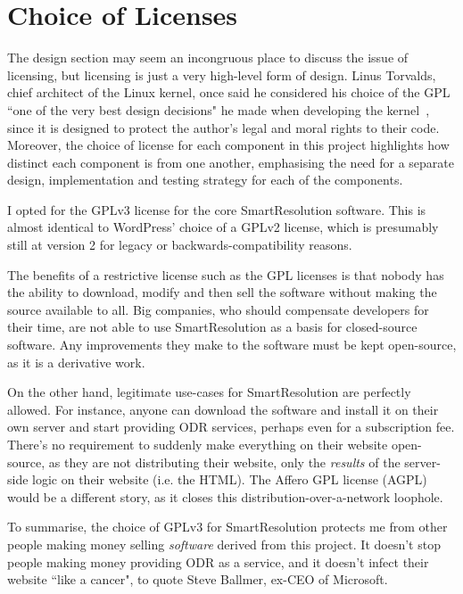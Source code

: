 \section{Choice of Licenses}

The design section may seem an incongruous place to discuss the issue of licensing, but licensing is just a very high-level form of design. Linus Torvalds, chief architect of the Linux kernel, once said he considered his choice of the GPL ``one of the very best design decisions" he made when developing the kernel~\cite{linusLinux}, since it is designed to protect the author's legal and moral rights to their code. Moreover, the choice of license for each component in this project highlights how distinct each component is from one another, emphasising the need for a separate design, implementation and testing strategy for each of the components.

I opted for the GPLv3 license for the core SmartResolution software. This is almost identical to WordPress' choice of a GPLv2 license, which is presumably still at version 2 for legacy or backwards-compatibility reasons.

The benefits of a restrictive license such as the GPL licenses is that nobody has the ability to download, modify and then sell the software without making the source available to all. Big companies, who should compensate developers for their time, are not able to use SmartResolution as a basis for closed-source software. Any improvements they make to the software must be kept open-source, as it is a derivative work.

On the other hand, legitimate use-cases for SmartResolution are perfectly allowed. For instance, anyone can download the software and install it on their own server and start providing ODR services, perhaps even for a subscription fee. There's no requirement to suddenly make everything on their website open-source, as they are not distributing their website, only the \emph{results} of the server-side logic on their website (i.e. the HTML). The Affero GPL license (AGPL) would be a different story, as it closes this distribution-over-a-network loophole.

To summarise, the choice of GPLv3 for SmartResolution protects me from other people making money selling \emph{software} derived from this project. It doesn't stop people making money providing ODR as a service, and it doesn't infect their website ``like a cancer", to quote Steve Ballmer, ex-CEO of Microsoft.~\cite{linuxCancer}

